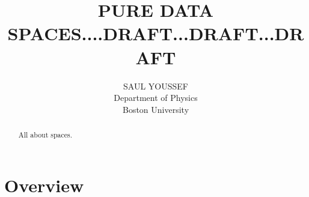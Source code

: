 \documentclass[11pt]{article}
\begin{document}
\title{\bf {PURE DATA SPACES....DRAFT...DRAFT...DRAFT}}
\author{%
  SAUL YOUSSEF%
  \hfil \\
  Department of Physics \\
  Boston University \\
}
\maketitle
\begin{abstract}
All about spaces.
\end{abstract}

\theoremstyle{definition}
\newtheorem{axiom}{Axiom}
\newtheorem*{axiom*}{Axiom}
\newtheorem*{fact}{Fact}

\newtheorem{definition}{Definition}

\newtheorem*{remark}{}

\section{Overview}
\end{document}
